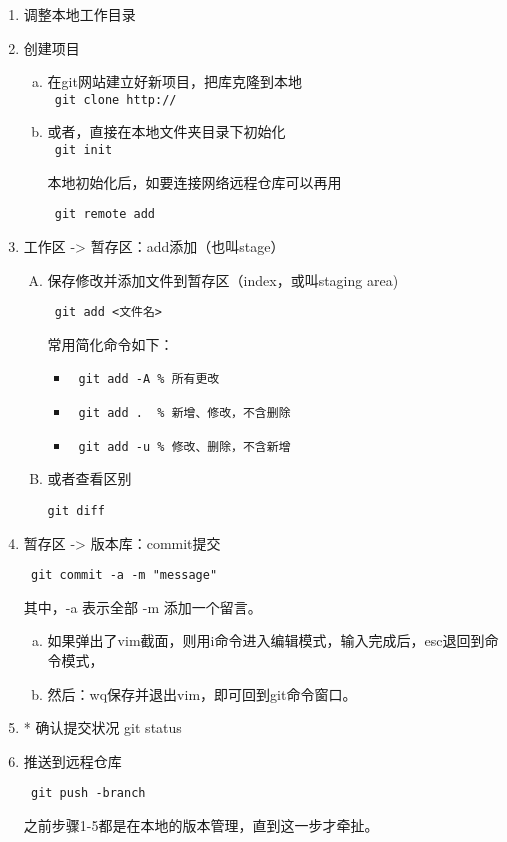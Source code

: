 \documentclass[../Main/thesis]{subfiles}
\begin{document}
\begin{enumerate}[1.]
  \item 调整本地工作目录
  \item 创建项目
  \begin{enumerate}[a.]
    \item 在git网站建立好新项目，把库克隆到本地 \\

    \verb| git clone http:// |

    \item 或者，直接在本地文件夹目录下初始化 \\

    \verb| git init |

    本地初始化后，如要连接网络远程仓库可以再用

    \verb| git remote add |
  \end{enumerate}

  \item 工作区 -> 暂存区：add添加（也叫stage）
    \begin{enumerate}[A.]
      \item 保存修改并添加文件到暂存区（index，或叫staging area)

      \verb| git add <文件名> |

      常用简化命令如下：
        \begin{itemize}[\textbullet]
          \item \verb| git add -A % 所有更改 |
          \item \verb| git add .  % 新增、修改，不含删除 |
          \item \verb| git add -u % 修改、删除，不含新增 |
        \end{itemize}

      \item 或者查看区别

      \verb!git diff!
    \end{enumerate}

  \item 暂存区 -> 版本库：commit提交

  \verb| git commit -a -m "message" |

  其中，-a 表示全部 -m 添加一个留言。
  \begin{enumerate}[(a)]
    \item 如果弹出了vim截面，则用i命令进入编辑模式，输入完成后，esc退回到命令模式，
    \item 然后：wq保存并退出vim，即可回到git命令窗口。
  \end{enumerate}

  \item * 确认提交状况  git status

  \item 推送到远程仓库

  \verb| git push -branch |

  之前步骤1-5都是在本地的版本管理，直到这一步才牵扯。
\end{enumerate}
\end{document}
